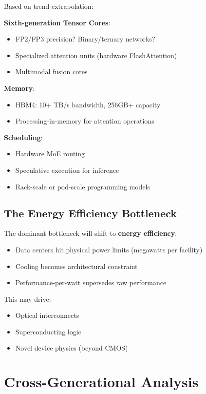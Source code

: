 \documentclass{article}
\begin{document}
Based on trend extrapolation:

\textbf{Sixth-generation Tensor Cores}:
\begin{itemize}
\item FP2/FP3 precision? Binary/ternary networks?
\item Specialized attention units (hardware FlashAttention)
\item Multimodal fusion cores
\end{itemize}

\textbf{Memory}:
\begin{itemize}
\item HBM4: 10+ TB/s bandwidth, 256GB+ capacity
\item Processing-in-memory for attention operations
\end{itemize}

\textbf{Scheduling}:
\begin{itemize}
\item Hardware MoE routing
\item Speculative execution for inference
\item Rack-scale or pod-scale programming models
\end{itemize}

\subsection{The Energy Efficiency Bottleneck}

The dominant bottleneck will shift to \textbf{energy efficiency}:
\begin{itemize}
\item Data centers hit physical power limits (megawatts per facility)
\item Cooling becomes architectural constraint
\item Performance-per-watt supersedes raw performance
\end{itemize}

This may drive:
\begin{itemize}
\item Optical interconnects
\item Superconducting logic
\item Novel device physics (beyond CMOS)
\end{itemize}

\section{Cross-Generational Analysis}
\end{document}
